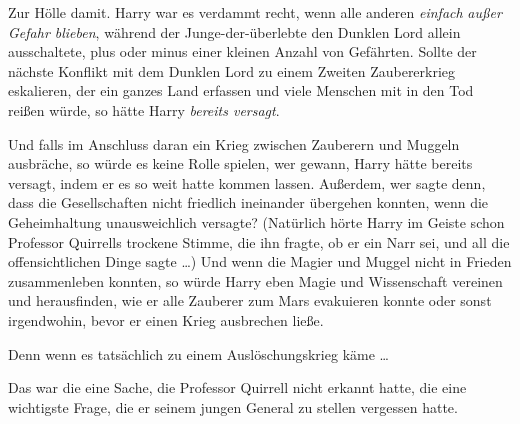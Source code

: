 Zur Hölle damit. Harry war es verdammt recht, wenn alle anderen \emph{einfach} \emph{außer Gefahr blieben}, während der Junge-der-überlebte den Dunklen Lord allein ausschaltete, plus oder minus einer kleinen Anzahl von Gefährten. Sollte der nächste Konflikt mit dem Dunklen Lord zu einem Zweiten Zaubererkrieg eskalieren, der ein ganzes Land erfassen und viele Menschen mit in den Tod reißen würde, so hätte Harry \emph{bereits versagt}.

Und falls im Anschluss daran ein Krieg zwischen Zauberern und Muggeln ausbräche, so würde es keine Rolle spielen, wer gewann, Harry hätte bereits versagt, indem er es so weit hatte kommen lassen. Außerdem, wer sagte denn, dass die Gesellschaften nicht friedlich ineinander übergehen konnten, wenn die Geheimhaltung unausweichlich versagte? (Natürlich hörte Harry im Geiste schon Professor Quirrells trockene Stimme, die ihn fragte, ob er ein Narr sei, und all die offensichtlichen Dinge sagte …) Und wenn die Magier und Muggel nicht in Frieden zusammenleben konnten, so würde Harry eben Magie und Wissenschaft vereinen und herausfinden, wie er alle Zauberer zum Mars evakuieren konnte oder sonst irgendwohin, bevor er einen Krieg ausbrechen ließe.%

Denn wenn es tatsächlich zu einem Auslöschungskrieg käme …

Das war die eine Sache, die Professor Quirrell nicht erkannt hatte, die eine wichtigste Frage, die er seinem jungen General zu stellen vergessen hatte.

